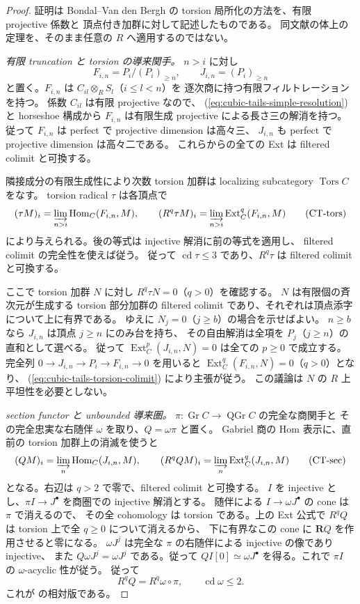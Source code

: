 \begin{proof}
証明は Bondal--Van den Bergh
\cite[\S4.1, Lemma 4.2.2]{BondalVanDenBergh2003}
の torsion 局所化の方法を、有限 projective 係数と
頂点付き加群に対して記述したものである。
同文献の体上の定理を、そのまま任意の $R$ へ適用するのではない。

\emph{有限 truncation と torsion の導来関手。}
$n>i$ に対し
\[
 F_{i,n}=P_i/(P_i)_{\ge n},\qquad J_{i,n}=(P_i)_{\ge n}
\]
と置く。$F_{i,n}$ は $C_{il}\otimes_RS_l$（$i\le l<n$）を
逐次商に持つ有限フィルトレーションを持つ。
係数 $C_{il}$ は有限 projective なので、
(\ref{eq:cubic-tails-simple-resolution}) と horseshoe 構成から
$F_{i,n}$ は有限生成 projective による長さ三の解消を持つ。
従って $F_{i,n}$ は perfect で projective dimension は高々三、
$J_{i,n}$ も perfect で projective dimension は高々二である。
これらからの全ての Ext は filtered colimit と可換する。

隣接成分の有限生成性により次数 torsion 加群は localizing subcategory
$\operatorname{Tors}C$ をなす。
torsion radical $\tau$ は各頂点で
\[
  (\tau M)_i=\varinjlim_{n>i}\operatorname{Hom}_C(F_{i,n},M),\qquad
  (R^q\tau M)_i=\varinjlim_{n>i}\operatorname{Ext}^q_C(F_{i,n},M)
  \tag{CT-tors}\label{eq:cubic-tails-torsion-colimit}
\]
により与えられる。後の等式は injective 解消に前の等式を適用し、
filtered colimit の完全性を使えば従う。
従って $\operatorname{cd}\tau\le3$ であり、$R^q\tau$ は
filtered colimit と可換する。

ここで torsion 加群 $N$ に対し $R^q\tau N=0$（$q>0$）を確認する。
$N$ は有限個の斉次元が生成する torsion 部分加群の filtered colimit
であり、それぞれは頂点添字について上に有界である。
ゆえに $N_j=0$（$j\ge b$）の場合を示せばよい。
$n\ge b$ なら $J_{i,n}$ は頂点 $j\ge n$ にのみ台を持ち、
その自由解消は全項を $P_j$（$j\ge n$）の直和として選べる。
従って $\operatorname{Ext}^p_C(J_{i,n},N)=0$ は全ての $p\ge0$
で成立する。完全列
$0\to J_{i,n}\to P_i\to F_{i,n}\to0$ を用いると
$\operatorname{Ext}^{q}_C(F_{i,n},N)=0$（$q>0$）となり、
(\ref{eq:cubic-tails-torsion-colimit}) により主張が従う。
この議論は $N$ の $R$ 上平坦性を必要としない。

\emph{section functor と unbounded 導来圏。}
$\pi:\operatorname{Gr}C\to\operatorname{QGr}C$ の完全な商関手と
その完全忠実な右随伴 $\omega$ を取り、$Q=\omega\pi$ と置く。
Gabriel 商の Hom 表示に、直前の torsion 加群上の消滅を使うと
\[
 (QM)_i=\varinjlim_n\operatorname{Hom}_C(J_{i,n},M),\qquad
 (R^qQM)_i=\varinjlim_n\operatorname{Ext}^q_C(J_{i,n},M)
 \tag{CT-sec}\label{eq:cubic-tails-section-colimit}
\]
となる。右辺は $q>2$ で零で、filtered colimit と可換する。
$I$ を injective とし、$\pi I\to J^\bullet$ を商圏での injective 解消とする。
随伴による $I\to\omega J^\bullet$ の cone は $\pi$ で消えるので、
その全 cohomology は torsion である。上の Ext 公式で
$R^qQ$ は torsion 上で全 $q\ge0$ について消えるから、
下に有界なこの cone に $\mathbf RQ$ を作用させると零になる。
$\omega J^j$ は完全な $\pi$ の右随伴による injective の像であり injective、
また $Q\omega J^j=\omega J^j$ である。従って
$QI[0]\simeq\omega J^\bullet$ を得る。これで $\pi I$ の
$\omega$-acyclic 性が従う。
従って
\[
  R^qQ=R^q\omega\circ\pi,\qquad \operatorname{cd}\omega\le2.
\]
これが \cite[Lemmas 4.1.4--4.1.7]{BondalVanDenBergh2003}
の相対版である。


\end{proof}
